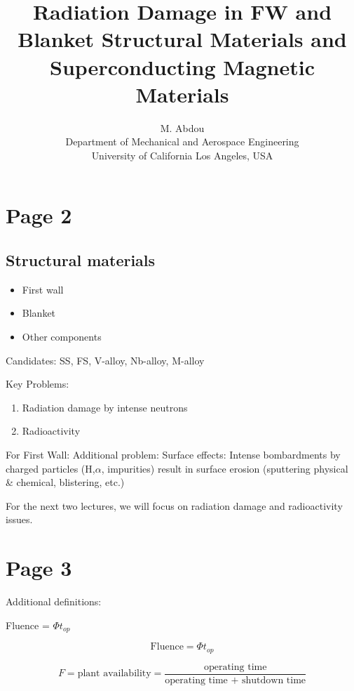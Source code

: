 \documentclass[11pt]{article}
\begin{document}
\doublespacing
\title{Radiation Damage in FW and Blanket Structural Materials and Superconducting Magnetic Materials}
\author{M. Abdou \\
Department of Mechanical and Aerospace Engineering \\
University of California Los Angeles, USA\\
}
\maketitle

\section{Page 2}
\subsection{Structural materials}
\begin{itemize}
\item First wall
\item Blanket
\item Other components
\end{itemize}
Candidates: SS, FS, V-alloy, Nb-alloy, M-alloy

Key Problems:
\begin{enumerate}
\item Radiation damage by intense neutrons
\item Radioactivity
\end{enumerate}

For First Wall:
Additional problem:
Surface effects: Intense bombardments by charged particles (H,$\alpha$, impurities) result in surface erosion (sputtering physical \& chemical, blistering, etc.)

For the next two lectures, we will focus on radiation damage and radioactivity issues.

\section{Page 3}
Additional definitions:

Fluence = $\Phi t_{op}$

\begin{equation}
	\text{Fluence} = \Phi t_{op}
\end{equation}

\begin{equation}
	F = \text{plant availability} = \frac{\text{operating time}}{\text{operating time + shutdown time}}
\end{equation}
\end{document}
